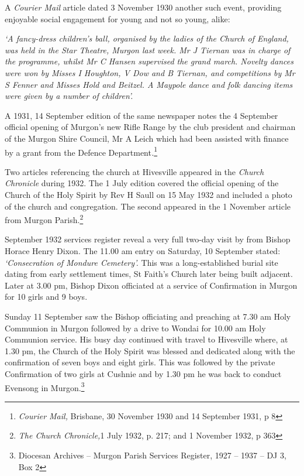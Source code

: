 A \emph{Courier Mail} article dated 3 November 1930 another such event, providing enjoyable social engagement for young and not so young, alike:



\emph{`A fancy-dress children's ball, organised by the ladies of the Church of England, was held in the Star Theatre, Murgon last week. Mr J Tiernan was in charge of the programme, whilst Mr C Hansen supervised the grand march. Novelty dances were won by Misses I Houghton, V Dow and B Tiernan, and competitions by Mr S Fenner and Misses Hold and Beitzel. A Maypole dance and folk dancing items were given by a number of children'.}



A 1931, 14 September edition of the same newspaper notes the 4 September official opening of Murgon's new Rifle Range by the club president and chairman of the Murgon Shire Council, Mr A Leich which had been assisted with finance by a grant from the Defence Department\emph{.}\footnote{\emph{Courier Mail,} Brisbane, 30 November 1930 and 14 September 1931, p 8}


Two articles referencing the church at Hivesville appeared in the \emph{Church Chronicle} during 1932. The 1 July edition covered the official opening of the Church of the Holy Spirit by Rev H Saull on 15 May 1932 and included a photo of the church and congregation. The second appeared in the 1 November article from Murgon Parish.\footnote{\emph{The Church Chronicle,}1 July 1932, p. 217; and 1 November 1932, p 363}


September 1932 services register reveal a very full two-day visit by from Bishop Horace Henry Dixon. The 11.00 am entry on Saturday, 10 September stated: \emph{`Consecration of Mondure Cemetery'.} This was a long-established burial site dating from early settlement times, St Faith's Church later being built adjacent. Later at 3.00 pm, Bishop Dixon officiated at a service of Confirmation in Murgon for 10 girls and 9 boys.



Sunday 11 September saw the Bishop officiating and preaching at 7.30 am Holy Communion in Murgon followed by a drive to Wondai for 10.00 am Holy Communion service. His busy day continued with travel to Hivesville where, at 1.30 pm, the Church of the Holy Spirit was blessed and dedicated along with the confirmation of seven boys and eight girls. This was followed by the private Confirmation of two girls at Cushnie and by 1.30 pm he was back to conduct Evensong in Murgon.\footnote{Diocesan Archives -- Murgon Parish Services Register, 1927 -- 1937 -- DJ 3, Box 2}


